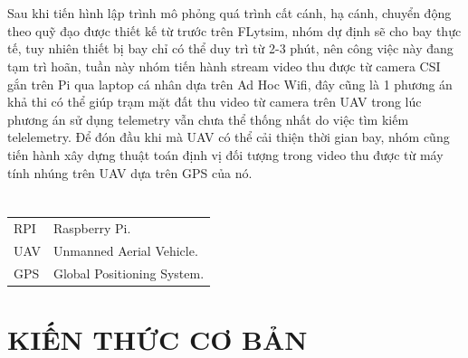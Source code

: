 \documentclass[12pt,a4paper]{report}
\begin{document}
\chapter*{}
\vskip 1cm
\hspace{25pt}Sau khi tiến hình lập trình mô phỏng quá trình cất cánh, hạ cánh, chuyển động theo quỹ đạo được thiết kế từ trước trên FLytsim, nhóm dự định sẽ cho bay thực tế, tuy nhiên thiết bị bay chỉ có thể duy trì từ 2-3 phút, nên công việc này đang tạm trì hoãn, tuần này nhóm tiến hành stream video thu được từ camera CSI gắn trên Pi qua laptop cá nhân dựa trên Ad Hoc Wifi, đây cũng là 1 phương án khả thi có thể giúp trạm mặt đất thu video từ camera trên UAV trong lúc phương án sử dụng telemetry vẫn chưa thể thống nhất do việc tìm kiếm telelemetry. Để đón đầu khi mà UAV có thể cải thiện thời gian bay, nhóm cũng tiến hành xây dựng thuật toán định vị đối tượng trong video thu được từ máy tính nhúng trên UAV dựa trên GPS của nó. 

\chapter*{}
\vskip 1cm
\begin{tabular}{l l }
RPI & Raspberry Pi.\\
UAV & Unmanned Aerial Vehicle.\\
GPS & Global Positioning System.\\
\end{tabular}

\tableofcontents
\chapter{KIẾN THỨC CƠ BẢN}         %
\end{document}
